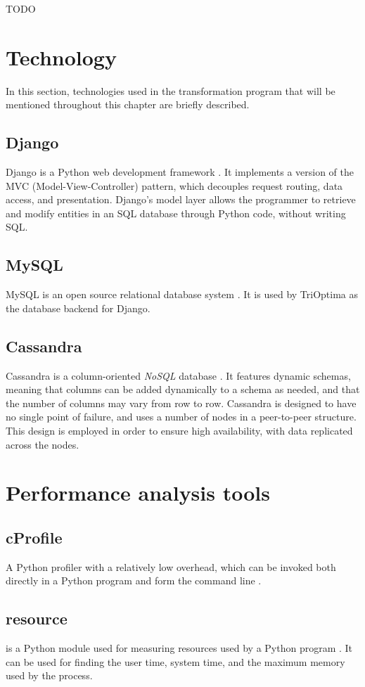 TODO

\section{Technology}
In this section, technologies used in the transformation program that will be mentioned throughout this chapter are briefly described.

\subsection{Django}
Django is a Python web development framework \cite{holovaty_chapter_c1itd}. It implements a version of the MVC (Model-View-Controller) pattern, which decouples request routing, data access, and
presentation. Django's model layer allows the programmer to retrieve and modify entities in an SQL database through Python code, without writing SQL.

\subsection{MySQL}
MySQL is an open source relational database system \cite{what_wim}. It is used by TriOptima as the database backend for Django.

\subsection{Cassandra}
Cassandra is a column-oriented \textit{NoSQL} database \cite[p. 1-9]{mishra_2014_beginning_bacd}. It features dynamic schemas, meaning that columns can be added dynamically to a schema as needed, and that
the number of columns may vary from row to row. Cassandra is designed to have no single point of failure, and uses a number of nodes in a peer-to-peer structure. This design is
employed in order to ensure high availability, with data replicated across the nodes.

\section{Performance analysis tools}
\subsection{cProfile}
A Python profiler with a relatively low overhead, which can be invoked both directly in a Python program and form the command line \cite{26_2tppp2d}.

\subsection{resource}
 is a Python module used for measuring resources used by a Python program \cite{36_3rruip2d}. It can be used for finding the user time, system time,
and the maximum memory used by the process.


